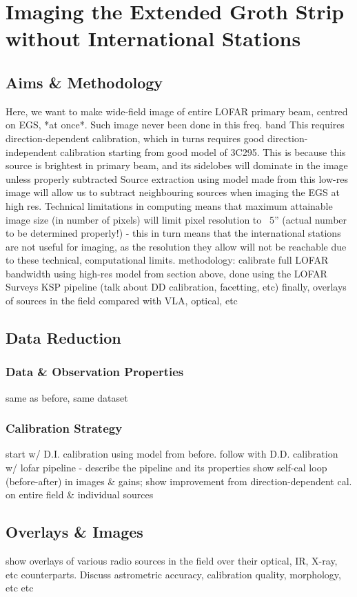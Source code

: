 \chapter{Imaging the Extended Groth Strip without International Stations}
\minitoc
\section{Aims \& Methodology}

\pg
Here, we want to make wide-field image of entire LOFAR primary beam, centred on EGS, *at once*. Such image never been done in this freq. band
\pg
This requires direction-dependent calibration, which in turns requires good direction-independent calibration starting from good model of 3C295. This is because this source is brightest in primary beam, and its sidelobes will dominate in the image unless properly subtracted
\pg
Source extraction using model made from this low-res image will allow us to subtract neighbouring sources when imaging the EGS at high res.
\pg
Technical limitations in computing means that maximum attainable image size (in number of pixels) will limit pixel resolution to ~5'' (actual number to be determined properly!) - this in turn means that the international stations are not useful for imaging, as the resolution they allow will not be reachable due to these technical, computational limits.
\pg
methodology: calibrate full LOFAR bandwidth using high-res model from section above, done using the LOFAR Surveys KSP pipeline (talk about DD calibration, facetting, etc)
finally, overlays of sources in the field compared with VLA, optical, etc


\section{Data Reduction}

\subsection{Data \& Observation Properties}
same as before, same dataset

\subsection{Calibration Strategy}

\pg
start w/ D.I. calibration using model from before.
\pg
follow with D.D. calibration w/ lofar pipeline - describe the pipeline and its properties
\pg
show self-cal loop (before-after) in images \& gains; show improvement from direction-dependent cal. on entire field \& individual sources



\section{Overlays \& Images}

\pg
show overlays of various radio sources in the field over their optical, IR, X-ray, etc counterparts. Discuss astrometric accuracy, calibration quality, morphology, etc etc


\newpage
